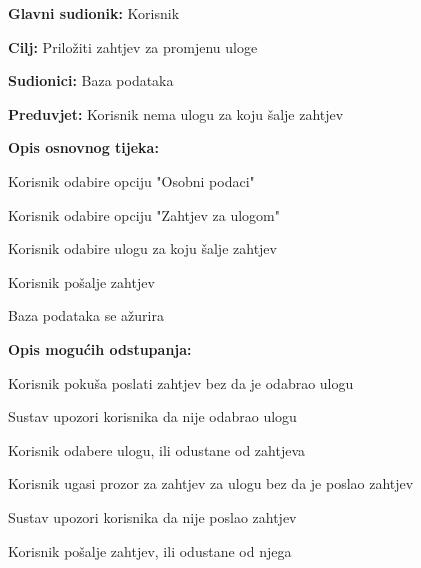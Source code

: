 					\noindent {}
					\begin{packed_item}
	
						\item \textbf{Glavni sudionik: }Korisnik
						\item  \textbf{Cilj:} Priložiti zahtjev za promjenu uloge
						\item  \textbf{Sudionici:} Baza podataka
						\item  \textbf{Preduvjet:} Korisnik nema ulogu za koju šalje zahtjev
						\item  \textbf{Opis osnovnog tijeka:}
						
						\item[] \begin{packed_enum}
	
							\item Korisnik odabire opciju "Osobni podaci"
							\item Korisnik odabire opciju "Zahtjev za ulogom"
							\item Korisnik odabire ulogu za koju šalje zahtjev
							\item Korisnik pošalje zahtjev
							\item Baza podataka se ažurira
						\end{packed_enum}
						
						\item  \textbf{Opis mogućih odstupanja:}
						
						\item[] \begin{packed_item}
						
							\item[3.a] Korisnik pokuša poslati zahtjev bez da je odabrao ulogu
							\item[] \begin{packed_enum}
								
								\item Sustav upozori korisnika da nije odabrao ulogu
								\item Korisnik odabere ulogu, ili odustane od zahtjeva
								
							\end{packed_enum}
	
							\item[4.a] Korisnik ugasi prozor za zahtjev za ulogu bez da je poslao zahtjev
							\item[] \begin{packed_enum}
								
								\item Sustav upozori korisnika da nije poslao zahtjev
								\item Korisnik pošalje zahtjev, ili odustane od njega
								
							\end{packed_enum}
							
						\end{packed_item}
					\end{packed_item}
					
